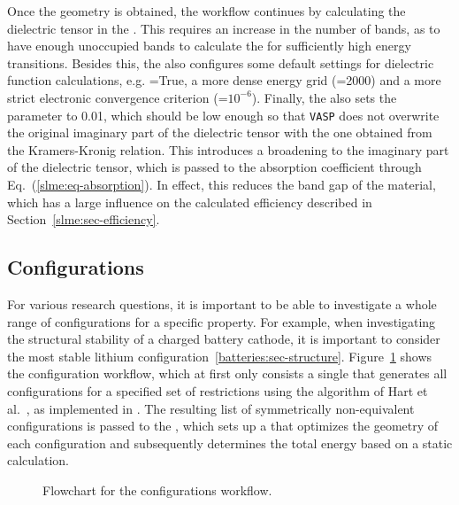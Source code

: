 \begin{refsection}
Once the geometry is obtained, the workflow continues by calculating the dielectric tensor in the . This requires an increase in the number of bands, as to have enough unoccupied bands to calculate the  for sufficiently high energy transitions. Besides this, the  also configures some default settings for dielectric function calculations, e.g. =True, a more dense energy grid (=2000) and a more strict electronic convergence criterion (=$10^{-6}$). Finally, the  also sets the  parameter to 0.01, which should be low enough so that \texttt{VASP} does not overwrite the original imaginary part of the dielectric tensor with the one obtained from the Kramers-Kronig relation. This introduces a broadening to the imaginary part of the dielectric tensor, which is passed to the absorption coefficient through Eq.~(\ref{slme:eq-absorption}). In effect, this reduces the band gap of the material, which has a large influence on the calculated efficiency described in Section~\ref{slme:sec-efficiency}.

\subsection{Configurations} \label{automation:sec-configurations}

For various research questions, it is important to be able to investigate a whole range of configurations for a specific property. For example, when investigating the structural stability of a charged battery cathode, it is important to consider the most stable lithium configuration~\ref{batteries:sec-structure}. Figure~\ref{automation:fig-configurations} shows the configuration workflow, which at first only consists a single  that generates all configurations for a specified set of restrictions using the algorithm of Hart et al.~\cite{Hart2005}, as implemented in . The resulting list of symmetrically non-equivalent configurations is passed to the , which sets up a  that optimizes the geometry of each configuration and subsequently determines the total energy based on a static calculation.

\begin{figure}[ht]
\centering

\caption{\label{automation:fig-configurations} Flowchart for the configurations workflow.}
\end{figure}


\end{refsection}
